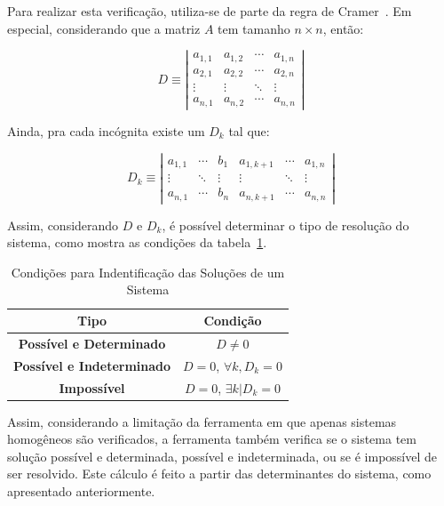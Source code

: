 \documentclass[a4paper,10pt]{report}
\begin{document}
Para realizar esta verificação, utiliza-se de parte da regra de Cramer~\cite{cramer}. Em especial, considerando que a matriz $A$ tem tamanho $n \times n$, então:

\[
D \equiv \left| \begin{array}{cccc}
a_{1,1} & a_{1,2} & \cdots & a_{1,n} \\
a_{2,1} & a_{2,2} & \cdots & a_{2,n} \\
\vdots  & \vdots & \ddots & \vdots \\
a_{n,1} & a_{n,2} & \cdots & a_{n,n}
\label{arr:detcoeficientes}
\end{array}\right|
\]

Ainda, pra cada incógnita existe um $D_{k}$ tal que:

\[
D_{k} \equiv \left| \begin{array}{ccccccc}
a_{1,1} & \cdots & b_{1} & a_{1,k+1} & \cdots & a_{1,n}\\
\vdots  & \ddots & \vdots & \vdots  & \ddots & \vdots \\
a_{n,1} & \cdots & b_{n} & a_{n,k+1} & \cdots & a_{n,n}
\label{arr:detcoeficientesk}
\end{array}\right|
\]

Assim, considerando $D$ e $D_{k}$, é possível determinar o tipo de resolução do sistema, como mostra as condições da tabela~\ref{tab:sistemad}.

\begin{table}[h]
\centering
\caption{Condições para Indentificação das Soluções de um Sistema}
        \begin{tabular}{|c|c|}
        \hline
        \textbf{Tipo} & \textbf{Condição} \\ \hline
        \textbf{Possível e Determinado} & $D \neq 0$ \\ \hline
        \textbf{Possível e Indeterminado} & $D = 0$, $\forall k, D_{k} = 0$ \\ \hline
        \textbf{Impossível} & $D = 0$, $\exists k | D_{k} = 0$ \\ \hline
        \end{tabular}
\label{tab:sistemad}
\end{table} 

Assim, considerando a limitação da ferramenta em que apenas sistemas homogêneos são verificados, a ferramenta também verifica se o sistema tem solução possível e determinada, possível e indeterminada, ou se é impossível de ser resolvido. Este cálculo é feito a partir das determinantes do sistema, como apresentado anteriormente.
\end{document}

